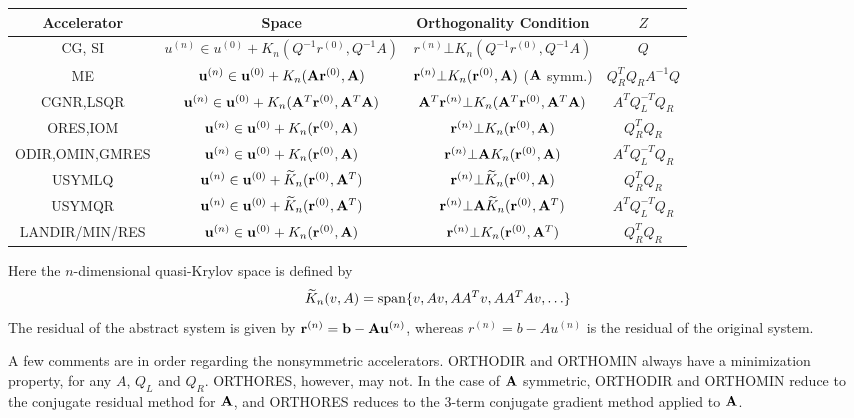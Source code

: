 \medskip
\begin{center}
\begin{tabular}{|c|c|c|c|} \hline
Accelerator & Space & Orthogonality Condition & $Z$ \\ \hline
CG, SI & $u^{(n)}\in u^{(0)}+K_n(Q^{-1}r^{(0)},Q^{-1}A)$
       & $r^{(n)}\bot K_n(Q^{-1}r^{(0)},Q^{-1}A)$
       & $Q$ \\ \hline
ME     & ${\bf u}^{(n)}\in {\bf u}^{(0)}+K_n({\bf A}{\bf r}^{(0)},{\bf A})$
       & ${\bf r}^{(n)}\bot K_n({\bf r}^{(0)},{\bf A})$ (${\bf A}$ symm.)
       & $Q_R^TQ_R A^{-1}Q$ \\ \hline
CGNR,LSQR & ${\bf u}^{(n)}\in {\bf u}^{(0)}+K_n({\bf A}^T{\bf r}^{(0)}, {\bf A}^T{\bf A})$
          & ${\bf A}^T{\bf r}^{(n)}\bot K_n({\bf A}^T{\bf r}^{(0)}, {\bf A}^T{\bf A})$
          & $A^TQ_L^{-T}Q_R$ \\ \hline
ORES,IOM  & ${\bf u}^{(n)}\in {\bf u}^{(0)}+K_n({\bf r}^{(0)},{\bf A})$
          & ${\bf r}^{(n)}\bot K_n({\bf r}^{(0)},{\bf A})$
          & $Q_R^TQ_R$ \\ \hline
ODIR,OMIN,GMRES 
          & ${\bf u}^{(n)}\in {\bf u}^{(0)}+K_n({\bf r}^{(0)},{\bf A})$
          & ${\bf r}^{(n)}\bot {\bf A} K_n({\bf r}^{(0)},{\bf A})$
          & $A^TQ_L^{-T}Q_R$ \\ \hline
USYMLQ    & ${\bf u}^{(n)}\in {\bf u}^{(0)}+\widetilde K_n({\bf r}^{(0)},{\bf A}^T)$
          & ${\bf r}^{(n)}\bot \widetilde K_n({\bf r}^{(0)},{\bf A})$
          & $Q_R^TQ_R$ \\ \hline
USYMQR    & ${\bf u}^{(n)}\in {\bf u}^{(0)}+\widetilde K_n({\bf r}^{(0)},{\bf A}^T)$
          & ${\bf r}^{(n)}\bot {\bf A}\widetilde K_n({\bf r}^{(0)},{\bf A}^T)$
          & $A^TQ_L^{-T}Q_R$ \\ \hline
LANDIR/MIN/RES 
          & ${\bf u}^{(n)}\in {\bf u}^{(0)}+K_n({\bf r}^{(0)},{\bf A})$
          & ${\bf r}^{(n)}\bot K_n({\bf r}^{(0)},{\bf A}^T)$
          & $Q_R^TQ_R$ \\ \hline
\end{tabular}
\end{center}
\bigskip

\noindent Here the $n$-dimensional quasi-Krylov space is defined by
\[ \widetilde K_n(v,A) = {\rm span} \{ v,Av,AA^Tv,AA^TAv,\ldots \} \]
The residual of the abstract system is given by 
${\bf r}^{(n)}={\bf b}-{\bf A}{\bf u}^{(n)}$, whereas $r^{(n)}=b-Au^{(n)}$ is the residual
of the original system.

A few comments are in order regarding the nonsymmetric accelerators.  
ORTHODIR and ORTHOMIN always have a minimization property, for any $A$, 
$Q_L$ and $Q_R$.  ORTHORES, however, may not.  In the case of ${\bf A}$ 
symmetric, ORTHODIR and ORTHOMIN reduce to the conjugate residual method 
for ${\bf A}$, and ORTHORES reduces to the 3-term conjugate gradient
method applied to ${\bf A}$.

